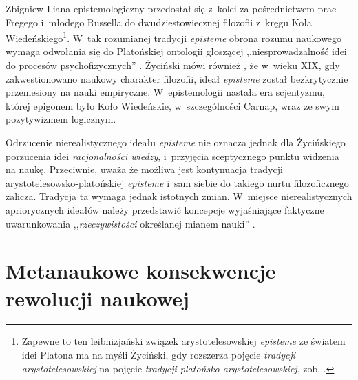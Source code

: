 \begin{artplenv}{Zbigniew Liana}
epistemologiczny przedostał się z~kolei za pośrednictwem prac Fregego i~młodego Russella do dwudziestowiecznej
filozofii z~kręgu Koła Wiedeńskiego\footnote{Zapewne to ten leibnizjański związek arystotelesowskiej \textit{episteme} ze
światem idei Platona ma na myśli Życiński, gdy rozszerza pojęcie \textit{tradycji arystotelesowskiej} na pojęcie
\textit{tradycji platońsko-arystotelesowskiej}, zob.
\parencites[s.~12]{zycinski_structure_1988}[s.~22]{zycinski_struktura_2013}[s.~126]{zycinski_elementy_1996}.
}. W~tak rozumianej tradycji \textit{episteme} obrona rozumu naukowego wymaga odwołania się do Platońskiej
ontologii głoszącej ,,niesprowadzalność idei do procesów psychofizycznych''
\parencite[s.~126]{zycinski_elementy_1996}.
Życiński mówi również
\parencite[s.~102n]{zycinski_jezyk_1983},
że w~wieku XIX, gdy zakwestionowano naukowy
charakter filozofii, ideał \textit{episteme} został bezkrytycznie przeniesiony na nauki empiryczne. W~epistemologii
nastała era scjentyzmu, której epigonem było Koło Wiedeńskie, w~szczególności Carnap, wraz ze swym pozytywizmem
logicznym.

Odrzucenie nierealistycznego ideału \textit{episteme} nie oznacza jednak dla Życińskiego porzucenia idei
\textit{racjonalności wiedzy}, i~przyjęcia sceptycznego punktu widzenia na naukę. Przeciwnie, uważa że możliwa jest
kontynuacja tradycji arystotelesowsko-platońskiej \textit{episteme} i~sam siebie do takiego nurtu filozoficznego zalicza.
Tradycja ta wymaga jednak istotnych zmian. W~miejsce nierealistycznych apriorycznych ideałów należy przedstawić
koncepcje wyjaśniające faktyczne uwarunkowania ,,\textit{rzeczywistości} określanej mianem nauki''
\parencite[zob.][s.~126 -- podkreślenie moje]{zycinski_elementy_1996}.

\section{Metanaukowe konsekwencje rewolucji naukowej}


\end{artplenv}
